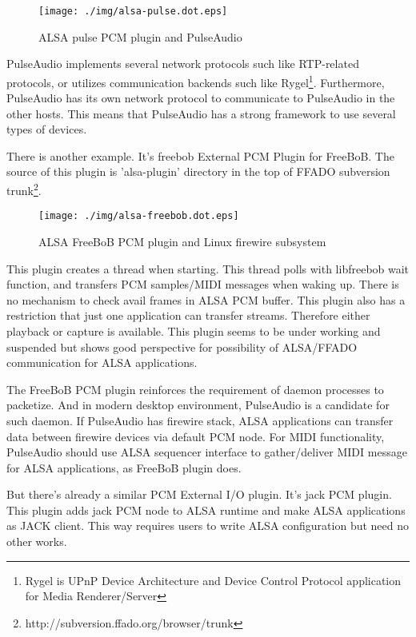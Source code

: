 \documentclass[onecolumn]{article}
\begin{document}
\begin{figure}[H]
	\centering
	\texttt{[image: ./img/alsa-pulse.dot.eps]}
	\caption{ALSA pulse PCM plugin and PulseAudio}
	\label{alsa-pulse}
\end{figure}

PulseAudio implements several network protocols such like RTP-related protocols, or utilizes communication backends such like Rygel\footnote{Rygel is UPnP Device Architecture and Device Control Protocol application for Media Renderer/Server}. Furthermore, PulseAudio has its own network protocol to communicate to PulseAudio in the other hosts. This means that PulseAudio has a strong framework to use several types of devices.

There is another example. It's freebob External PCM Plugin for FreeBoB. The source of this plugin is 'alsa-plugin' directory in the top of FFADO subversion trunk\footnote{http://subversion.ffado.org/browser/trunk}.

\begin{figure}[H]
	\centering
	\texttt{[image: ./img/alsa-freebob.dot.eps]}
	\caption{{ALSA FreeBoB PCM plugin and Linux firewire subsystem}}
	\label{alsa_freebob}
\end{figure}

This plugin creates a thread when starting. This thread polls with libfreebob wait function, and transfers PCM samples/MIDI messages when waking up. There is no mechanism to check avail frames in ALSA PCM buffer. This plugin also has a restriction that just one application can transfer streams. Therefore either playback or capture is available. This plugin seems to be under working and suspended but shows good perspective for possibility of ALSA/FFADO communication for ALSA applications.

The FreeBoB PCM plugin reinforces the requirement of daemon processes to packetize. And in modern desktop environment, PulseAudio is a candidate for such daemon. If PulseAudio has firewire stack, ALSA applications can transfer data between firewire devices via default PCM node. For MIDI functionality, PulseAudio should use ALSA sequencer interface to gather/deliver MIDI message for ALSA applications, as FreeBoB plugin does.

But there's already a similar PCM External I/O plugin. It's jack PCM plugin. This plugin adds jack PCM node to ALSA runtime and make ALSA applications as JACK client. This way requires users to write ALSA configuration but need no other works.
\end{document}
